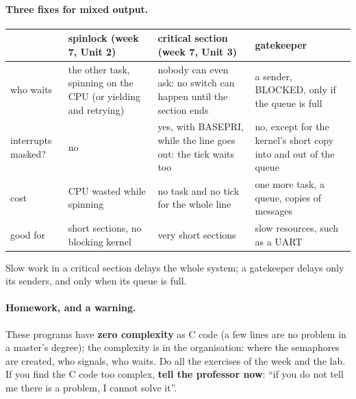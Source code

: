 \paragraph{Three fixes for mixed output.}
\begin{center}
\footnotesize
\begin{tabular}{P{0.13} P{0.24} P{0.24} P{0.26}}
    \hline
    & \textbf{spinlock (week 7, Unit 2)} & \textbf{critical section (week 7, Unit 3)} & \textbf{gatekeeper} \\
    \hline
    who waits & the other task, spinning on the CPU (or yielding and retrying) & nobody can even ask: no switch can happen until the section ends & a sender, BLOCKED, only if the queue is full \\
    interrupts masked? & no & yes, with BASEPRI, while the line goes out: the tick waits too & no, except for the kernel's short copy into and out of the queue \\
    cost & CPU wasted while spinning & no task and no tick for the whole line & one more task, a queue, copies of messages \\
    good for & short sections, no blocking kernel & very short sections & slow resources, such as a UART \\
    \hline
\end{tabular}
\end{center}
Slow work in a critical section delays the whole system; a gatekeeper delays only its senders, and only when its queue is full.

\paragraph{Homework, and a warning.} These programs have \textbf{zero complexity} as C code (a few lines are no problem in a master's degree); the complexity is in the organisation: where the semaphores are created, who signals, who waits. Do all the exercises of the week and the lab. If you find the C code too complex, \textbf{tell the professor now}: ``if you do not tell me there is a problem, I cannot solve it''.

